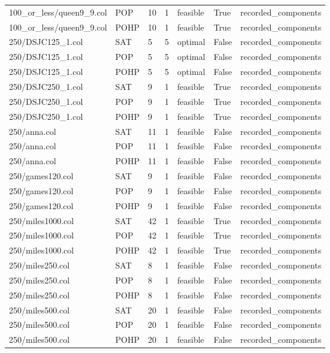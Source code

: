 \begin{table}[htbp]
\begin{tabular}{lllllll}
100\_or\_less/queen9\_9.col & POP & 10 & 1 & feasible & True & recorded\_components \\
100\_or\_less/queen9\_9.col & POHP & 10 & 1 & feasible & True & recorded\_components \\
250/DSJC125\_1.col & SAT & 5 & 5 & optimal & False & recorded\_components \\
250/DSJC125\_1.col & POP & 5 & 5 & optimal & False & recorded\_components \\
250/DSJC125\_1.col & POHP & 5 & 5 & optimal & False & recorded\_components \\
250/DSJC250\_1.col & SAT & 9 & 1 & feasible & True & recorded\_components \\
250/DSJC250\_1.col & POP & 9 & 1 & feasible & True & recorded\_components \\
250/DSJC250\_1.col & POHP & 9 & 1 & feasible & True & recorded\_components \\
250/anna.col & SAT & 11 & 1 & feasible & False & recorded\_components \\
250/anna.col & POP & 11 & 1 & feasible & False & recorded\_components \\
250/anna.col & POHP & 11 & 1 & feasible & False & recorded\_components \\
250/games120.col & SAT & 9 & 1 & feasible & False & recorded\_components \\
250/games120.col & POP & 9 & 1 & feasible & False & recorded\_components \\
250/games120.col & POHP & 9 & 1 & feasible & False & recorded\_components \\
250/miles1000.col & SAT & 42 & 1 & feasible & True & recorded\_components \\
250/miles1000.col & POP & 42 & 1 & feasible & True & recorded\_components \\
250/miles1000.col & POHP & 42 & 1 & feasible & True & recorded\_components \\
250/miles250.col & SAT & 8 & 1 & feasible & False & recorded\_components \\
250/miles250.col & POP & 8 & 1 & feasible & False & recorded\_components \\
250/miles250.col & POHP & 8 & 1 & feasible & False & recorded\_components \\
250/miles500.col & SAT & 20 & 1 & feasible & False & recorded\_components \\
250/miles500.col & POP & 20 & 1 & feasible & False & recorded\_components \\
250/miles500.col & POHP & 20 & 1 & feasible & False & recorded\_components \\

\end{tabular}
\end{table}
